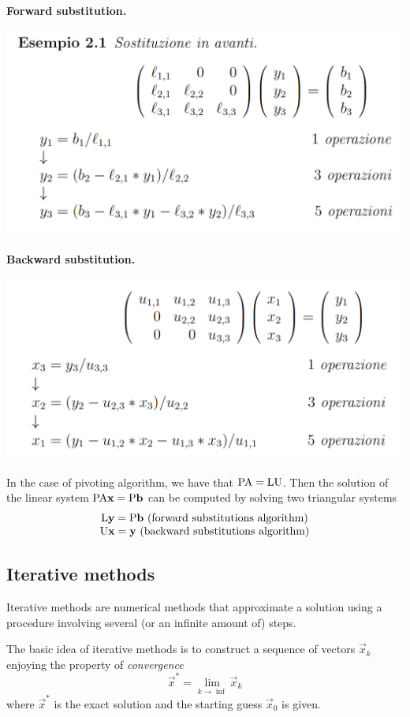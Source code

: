 \textbf{Forward substitution.}

\includegraphics[width=0.7 \textwidth]{sections/images/forsub.png}

\textbf{Backward substitution.}

\includegraphics[width=0.7 \textwidth]{sections/images/backsub.png}

In the case of pivoting algorithm, we have that $\mathrm{P} \mathrm{A}=\mathrm{L} \mathrm{U}$. Then 
 the solution of the linear system $\mathrm{P} \mathrm{A}\mathbf{x} = \mathrm{P} \mathbf{b}$ can be computed by solving two triangular systems
$$
    \begin{matrix}
        \mathrm{L}\mathbf{y} = \mathrm{P}\mathbf{b}\ \text{(forward substitutions algorithm)}\\
        \mathrm{U}\mathbf{x} = \mathbf{y}\ \text{(backward substitutions algorithm)}
    \end{matrix}
$$

\subsection{Iterative methods}

Iterative methods are numerical methods that approximate a solution using a procedure involving several (or an infinite amount of) steps. 

The basic idea of iterative methods is to construct a sequence of vectors $\vec{x}_k$ enjoying the property of \textit{convergence}
$$ \vec{x}^* = \lim_{k \rightarrow \inf}{\vec{x}_k} $$
where $\vec{x}^*$ is the exact solution and the starting guess $\vec{x}_0$ is given.

